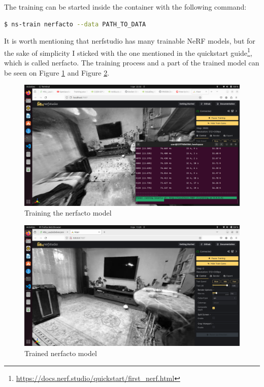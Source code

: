 The training can be started inside the container with the following command:
\begin{lstlisting}[language=bash,frame=single,float=!ht]
$ ns-train nerfacto --data PATH_TO_DATA
\end{lstlisting}
It is worth mentioning that nerfstudio has many trainable NeRF models, but for the sake of simplicity I sticked with the one mentioned in the quickstart guide\footnote{\url{https://docs.nerf.studio/quickstart/first_nerf.html}}, which is called nerfacto. The training process and a part of the trained model can be seen on Figure \ref{fig:training_nerf_karcag} and Figure \ref{fig:trained_nerf_karcag}.

\begin{figure}[H]
	\centering
	\includegraphics[width=150mm, keepaspectratio]{figures/nerfstudio.png}
	\caption{Training the nerfacto model}
	\label{fig:training_nerf_karcag}
\end{figure}

\begin{figure}[H]
	\centering
	\includegraphics[width=150mm, keepaspectratio]{figures/trained_nerf_karcag1.png}
	\caption{Trained nerfacto model}
	\label{fig:trained_nerf_karcag}
\end{figure}

